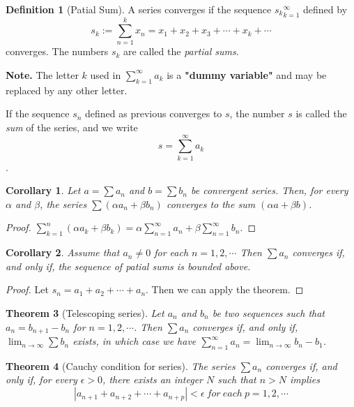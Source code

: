 \documentclass{article}
\newtheorem{theorem}{Theorem}[section]
\newtheorem{corollary}[theorem]{Corollary}
\theoremstyle{definition}
\newtheorem{defi}{Definition}[section]
\begin{document}
\begin{defi}[Patial Sum]
A series converges if the sequence ${s_{k}}_{k=1}^{\infty}$ defined by 
$$s_{k}:=\sum_{n=1}^{k}x_{n}=x_{1}+x_{2}+x_{3}+\cdots +x_{k}+\cdots$$
converges. The numbers $s_{k}$ are called the \textit{partial sums}.
\end{defi}

\textbf{Note.} The letter $k$ used in $\sum_{k=1}^{\infty}a_{k}$ 
is a \textbf{"dummy variable"} and may be replaced by 
any other letter.

If the sequence ${s_{n}}$ defined as previous converges to $s$, the 
number $s$ is called the \textit{sum} of the series, and we write
$$ s=\sum_{k=1}^{\infty}a_{k}$$.

\begin{corollary}
    Let $a=\sum a_{n}$ and $b=\sum b_{n}$ be convergent 
    series. Then, for every $\alpha$ and $\beta$, the series $\sum (\alpha a_{n}+\beta b_{n})$
    converges to the sum $(\alpha a+\beta b)$.
\end{corollary}
\begin{proof}
    $\sum_{k=1}^{n} (\alpha a_{k}+\beta b_{k})=\alpha \sum_{n=1}^{\infty}a_{n}+\beta \sum_{n=1}^{\infty}b_{n}.$
\end{proof}

\begin{corollary}
    Assume that $a_{n}\neq 0$ for each $n=1,2,\cdots$ Then $\sum a_{n}$
    converges if, and only if, the sequence of patial sums is bounded above.
\end{corollary}
\begin{proof}
    Let $s_{n}=a_{1}+a_{2}+\cdots+a_{n}$. Then we can apply the theorem.
\end{proof}

\begin{theorem}[Telescoping series]
    Let ${a_{n}}$ and ${b_{n}}$ be two sequences 
    such that $a_{n}=b_{n+1}-b_{n}$ for $n=1,2,\cdots$.
    Then $\sum a_{n}$ converges if, and only if, 
    $\lim_{n\rightarrow \infty}\sum b_{n}$ exists, in which 
    case we have $\sum_{n=1}^{\infty} a_{n}=\lim_{n\rightarrow \infty}b_{n}-b_{1}$.
\end{theorem}

\begin{theorem}[Cauchy condition for series]
    The series $\sum a_{n}$ converges if, and only if,
    for every $\epsilon>0$, there exists an integer $N$ such that
    $n>N$ implies 
    $$|a_{n+1}+a_{n+2}+\cdots+a_{n+p}|<\epsilon\ for\ each\ p=1,2,\cdots$$
\end{theorem}
\end{document}
